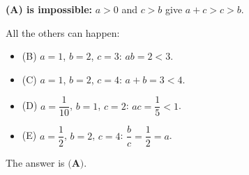 \textbf{(A) is impossible:} $a>0$ and $c>b$ give $a+c>c>b$.

All the others can happen:
\begin{itemize}
\item (B) $a=1$, $b=2$, $c=3$: $ab=2<3$.
\item (C) $a=1$, $b=2$, $c=4$: $a+b=3<4$.
\item (D) $a=\dfrac{1}{10}$, $b=1$, $c=2$: $ac=\dfrac{1}{5}<1$.
\item (E) $a=\dfrac{1}{2}$, $b=2$, $c=4$: $\dfrac {b}{c}=\dfrac{1}{2}=a$.
\end{itemize}
The answer is $\boxed{\textbf{(A)}}$.
